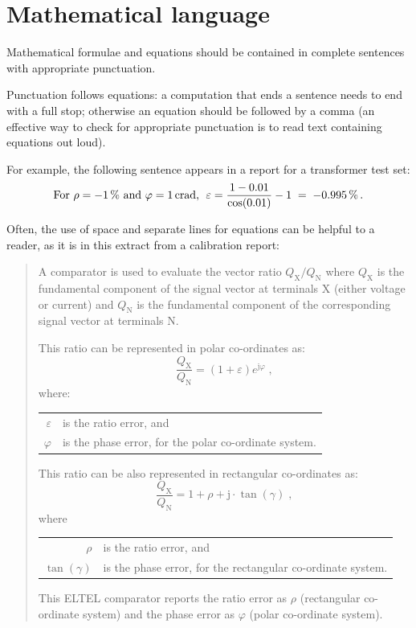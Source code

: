 \section{Mathematical language}
Mathematical formulae and equations should be contained in complete sentences with appropriate punctuation. 

Punctuation follows equations: a computation that ends a sentence needs to end with a full stop; otherwise an equation should be followed by a comma (an effective way to check for appropriate punctuation is to read text containing equations out loud). 

For example, the following sentence appears in a report for a transformer test set: 
\[
\text{For $\rho = \SI{-1}{\%}$ and $\varphi= \SI{1}{crad}$,\; }
\varepsilon = \frac{1-0.01}{\cos(0.01)} - 1 \; =\; \SI{-0.995}{\%}\,. 
\]

Often, the use of space and separate lines for equations can be helpful to a reader, as it is in this extract from a calibration report:
\begin{quote}

A comparator is used to evaluate the vector ratio $Q_\mathrm{X}/Q_\mathrm{N}$ where $Q_\mathrm{X}$ is the fundamental component of the signal vector at terminals X (either voltage or current) and $Q_\mathrm{N}$ is the fundamental component of the corresponding signal vector at terminals N. 

This ratio can be represented in polar co-ordinates as:
\[
\frac{Q_\mathrm{X}}{Q_\mathrm{N}} = (1 + \varepsilon) e^{\mathrm{j}\varphi} \;,
\]
where:

\begin{tabular}{rl}
$\varepsilon$ & is the ratio error, and \\
$\varphi$ & is the phase error, for the polar co-ordinate system. 
\end{tabular}

\vspace{\baselineskip}
This ratio can be also represented in rectangular co-ordinates as:
\[
\frac{Q_\mathrm{X}}{Q_\mathrm{N}} = 1 + \rho + \mathrm{j}\cdot\tan (\gamma) \;,
\]
where
\begin{tabular}{rl}
	$\rho$ &  is the ratio error, and \\
	$\tan (\gamma)$ & is the phase error, for the rectangular co-ordinate system. 
\end{tabular}

\vspace{\baselineskip}	
This ELTEL comparator reports the ratio error as $\rho$ (rectangular co-ordinate system) and the phase error as $\varphi$ (polar co-ordinate system).
\end{quote}

